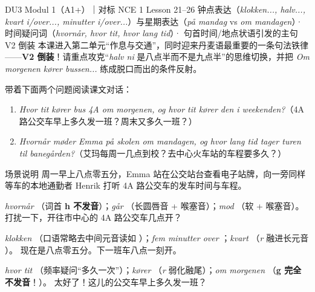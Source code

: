 {DU3 Modul 1（A1+）｜对标 NCE 1 Lesson 21--26}
{钟点表达（\textit{klokken..., halv..., kvart i/over..., minutter i/over...}）与星期表达（\textit{på mandag} vs \textit{om mandagen}）· 时间疑问词（\textit{hvornår, hvor tit, hvor lang tid}）· 句首时间/地点状语引发的主句 V2 倒装}
{本课进入第二单元“作息与交通”，同时迎来丹麦语最重要的一条句法铁律——\textbf{V2 倒装}！请重点攻克“\textit{halv ni} 是八点半而不是九点半”的思维切换，并把 \textit{Om morgenen kører bussen...} 练成脱口而出的条件反射。}

\begin{foerduleaeser}
带着下面两个问题阅读课文对话：
\begin{enumerate}
  \item \textit{Hvor tit kører bus 4A om morgenen, og hvor tit kører den i weekenden?}（4A 路公交车早上多久发一班？周末又多久一班？）
  \item \textit{Hvornår møder Emma på skolen om mandagen, og hvor lang tid tager turen til banegården?}（艾玛每周一几点到校？去中心火车站的车程要多久？）
\end{enumerate}
\end{foerduleaeser}


\begin{tipbox}{场景说明}
周一早上八点零五分，Emma 站在公交站台查看电子站牌，向一旁同样等车的本地通勤者 Henrik 打听 4A 路公交车的发车时间与车程。
\end{tipbox}

{\textit{hvornår} （词首 \textbf{h 不发音}）；\textit{går} （长圆唇音 + 喉塞音）；\textit{mod} （软  + 喉塞音）。}
{打扰一下，开往市中心的 4A 路公交车几点开？}

{\textit{klokken} （口语常略去中间元音读如 ）；\textit{fem minutter over} ；\textit{kvart} （\textit{r} 融进长元音 ）。}
{现在是八点零五分。下一班车八点一刻开。}

{\textit{hvor tit} （频率疑问“多久一次”）；\textit{kører} （\textit{r} 弱化融尾）；\textit{om morgenen} （\textbf{g 完全不发音}！）。}
{太好了！这儿的公交车早上多久发一班？}

